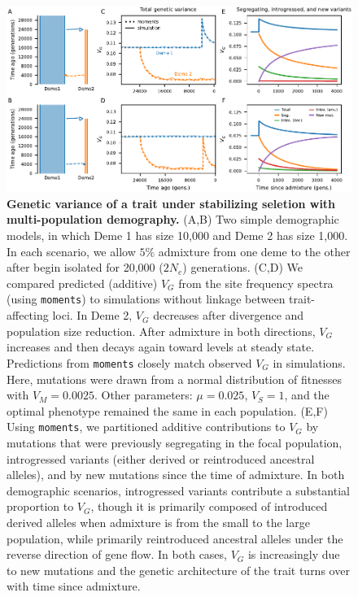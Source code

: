 \documentclass{article}
\newcommand{\moments}{\texttt{moments}\xspace}
\begin{document}
\begin{figure}[tb!]
    \centering
    \includegraphics{../figures/reciprocal_admixture.pdf}
    \caption{
        \textbf{Genetic variance of a trait under stabilizing seletion with
        multi-population demography.}
        (A,B) Two simple demographic models, in which Deme 1 has size 10,000
        and Deme 2 has size 1,000. In each scenario, we allow $5\%$ admixture
        from one deme to the other after begin isolated for 20,000 ($2N_e$)
        generations.
        (C,D) We compared predicted (additive) $V_G$ from the site frequency
        spectra (using \moments) to simulations
        without linkage between trait-affecting loci. In Deme 2, $V_G$ decreases
        after divergence and population size reduction. After admixture in both
        directions, $V_G$ increases and then decays again toward levels at steady
        state. Predictions from \moments closely match observed $V_G$ in
        simulations.
        Here, mutations were drawn from a normal distribution of fitnesses
        with $V_M=0.0025$.
        Other parameters: $\mu=0.025$, $V_S=1$, and the optimal phenotype remained
        the same in each population.
        (E,F) Using \moments, we partitioned additive contributions to $V_G$ by
        mutations that were previously segregating in the focal population,
        introgressed variants (either derived or reintroduced ancestral alleles),
        and by new mutations since the time of admixture. In both demographic
        scenarios, introgressed variants contribute a substantial proportion to
        $V_G$, though it is primarily composed of introduced derived alleles when
        admixture is from the small to the large population, while primarily
        reintroduced ancestral alleles under the reverse direction of gene flow.
        In both cases, $V_G$ is increasingly due to new mutations and the genetic
        architecture of the trait turns over with time since admixture.
    }
    \label{fig:toy-admixture}
\end{figure}
\end{document}
